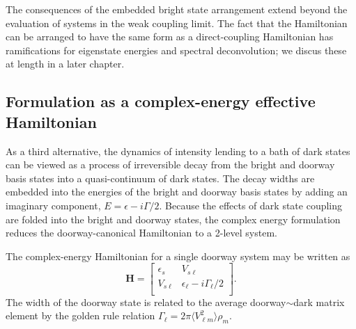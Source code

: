 \documentclass[12pt]{mitthesis}
\begin{document}
The consequences of the embedded bright state arrangement extend
beyond the evaluation of systems in the weak coupling limit.  The fact
that the Hamiltonian can be arranged to have the same form as a
direct-coupling Hamiltonian has ramifications for eigenstate energies
and spectral deconvolution; we discus these at length in a later
chapter.

\subsection{Formulation as a complex-energy effective
  Hamiltonian}
\label{sec:complex-energy}

As a third alternative, the dynamics of intensity lending to a bath of
dark states can be viewed as a process of irreversible decay from the
bright and doorway basis states into a quasi-continuum of dark
states. The decay widths are embedded into the energies of the bright
and doorway basis states by adding an imaginary component, $E =
\epsilon -i \Gamma / 2$. Because the effects of dark state coupling
are folded into the bright and doorway states, the complex energy
formulation reduces the doorway-canonical Hamiltonian to a 2-level
system.

The complex-energy Hamiltonian for a single doorway system may be
written as
\begin{equation}
  \label{eq:complex-h}
  \mathbf{H} = 
  \begin{bmatrix}
    \epsilon_s & V_{s\ell} \\
    V_{s\ell} & \epsilon_{\ell} - i \Gamma_{\ell} / 2 \\
  \end{bmatrix}.
\end{equation}
The width of the doorway state is related to the average doorway$\sim$dark
matrix element by the golden rule relation $\Gamma_{\ell} = 2 \pi \langle
V_{\ell m}^2 \rangle \rho_{m}$.
\end{document}
